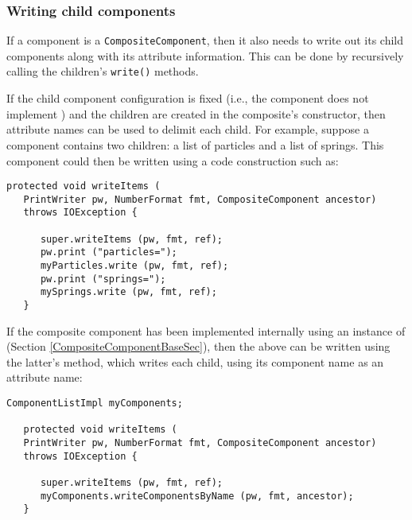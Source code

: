 \documentclass{article}
\begin{document}
\subsubsection{Writing child components}
\label{writingChildrenSec}

If a component is a {\tt CompositeComponent}, then it also needs to write
out its child components along with its attribute information. This
can be done by recursively calling the children's {\tt write()} methods.

If the child component configuration is fixed (i.e., the component
does not implement
)
and the children are created in the composite's constructor,
then attribute names can be used to delimit each child. For example, suppose
a component contains two children: a list of particles and a
list of springs. This component could then be written using
a code construction such as:
\begin{lstlisting}[]
   protected void writeItems (
   PrintWriter pw, NumberFormat fmt, CompositeComponent ancestor) 
   throws IOException {

      super.writeItems (pw, fmt, ref);
      pw.print ("particles=");
      myParticles.write (pw, fmt, ref);
      pw.print ("springs=");
      mySprings.write (pw, fmt, ref);
   }   
\end{lstlisting}
If the composite component has been implemented internally using
an instance of 
(Section \ref{CompositeComponentBaseSec}), then the
above can be written using the latter's
method, which writes each child, using its component name as an attribute name:
\begin{lstlisting}[]
   ComponentListImpl myComponents; 

   protected void writeItems (
   PrintWriter pw, NumberFormat fmt, CompositeComponent ancestor) 
   throws IOException {

      super.writeItems (pw, fmt, ref);
      myComponents.writeComponentsByName (pw, fmt, ancestor);
   }   
\end{lstlisting}
\end{document}
